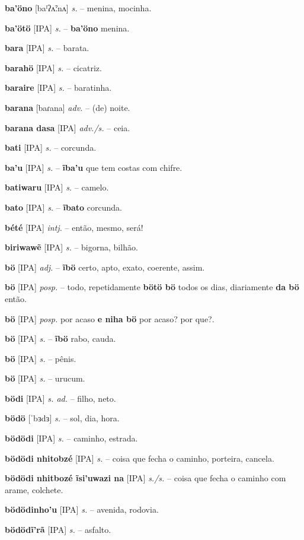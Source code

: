 \textbf{ba'öno} [baˡʔʌ̃ːnʌ] \textit{s.} -- menina, mocinha.

\textbf{ba'ötö} [IPA] \textit{s.} -- \textbf{ba'öno} menina.

\textbf{bara} [IPA] \textit{s.} -- barata.

\textbf{barahö} [IPA] \textit{s.} -- cicatriz.

\textbf{baraire} [IPA] \textit{s.} -- baratinha.

\textbf{barana} [baɾana] \textit{adv.} -- (de) noite.

\textbf{barana dasa} [IPA] \textit{adv./s.} -- ceia.

\textbf{bati} [IPA] \textit{s.} -- corcunda.

\textbf{ba'u} [IPA] \textit{s.} -- \textbf{ĩba'u} que tem costas com chifre.

\textbf{batiwaru} [IPA] \textit{s.} -- camelo.

\textbf{bato} [IPA] \textit{s.} -- \textbf{ĩbato} corcunda.

\textbf{bété} [IPA] \textit{intj.} -- então, mesmo, será!

\textbf{biriwawẽ} [IPA] \textit{s.} -- bigorna, bilhão.

\textbf{bö} [IPA] \textit{adj.} -- \textbf{ĩbö} certo, apto, exato, coerente, assim.

\textbf{bö} [IPA] \textit{posp.} -- todo, repetidamente  \textbf{bötö bö} todos os dias, diariamente  \textbf{da bö} então.

\textbf{bö} [IPA] \textit{posp.} por acaso  \textbf{e niha bö} por acaso? por que?.

\textbf{bö} [IPA] \textit{s.} -- \textbf{ĩbö} rabo, cauda.

\textbf{bö} [IPA] \textit{s.} -- pênis.

\textbf{bö} [IPA] \textit{s.} -- urucum.

\textbf{bödi} [IPA] \textit{s. ad.} -- filho, neto.

\textbf{bödö} [ˈbɜdɜ] \textit{s.} -- sol, dia, hora.

\textbf{bödödi} [IPA] \textit{s.} -- caminho, estrada.

\textbf{bödödi nhitobzé} [IPA] \textit{s.} -- coisa que fecha o caminho, porteira, cancela.

\textbf{bödödi nhitbozé ĩsi'uwazi na} [IPA] \textit{s./s.} -- coisa que fecha o caminho com arame, colchete.

\textbf{bödödinho'u} [IPA] \textit{s.} -- avenida, rodovia.

\textbf{bödödĩ'rã} [IPA] \textit{s.} -- asfalto.

